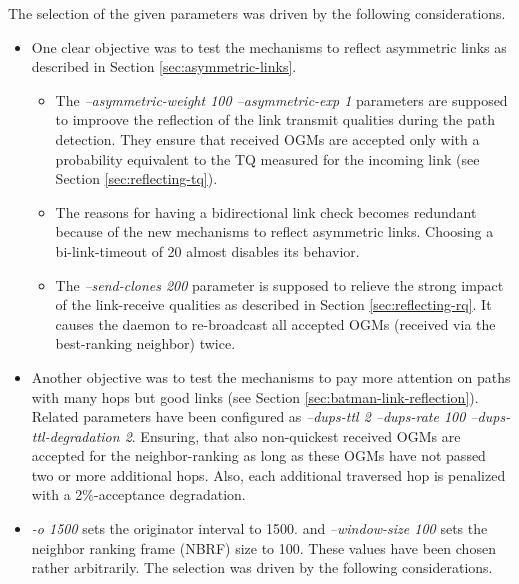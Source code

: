 \documentclass[11pt]{article}
\begin{document}
The selection of the given parameters was driven by the following considerations.
\begin{itemize}


\item One clear objective was to test the mechanisms to reflect asymmetric links as described in Section \ref{sec:asymmetric-links}. 

\begin{itemize}

\item The \emph{--asymmetric-weight 100 --asymmetric-exp 1} parameters are supposed to improove the reflection of the link transmit qualities during the path detection. 
%
They ensure that received OGMs are accepted only with a probability equivalent to the TQ measured for the incoming link (see Section \ref{sec:reflecting-tq}). 

\item The reasons for having a bidirectional link check becomes redundant because of the new mechanisms to reflect asymmetric links. Choosing a bi-link-timeout of 20 almost disables its behavior.

\item The \emph{--send-clones 200} parameter is supposed to relieve the strong impact of the link-receive qualities as described in Section \ref{sec:reflecting-rq}. It causes the daemon to re-broadcast all accepted OGMs (received via the best-ranking neighbor) twice.

\end{itemize}

\item Another objective was to test the mechanisms to pay more attention on paths with many hops but good links (see Section \ref{sec:batman-link-reflection}). 
Related parameters have been configured as \emph{--dups-ttl 2 --dups-rate 100 --dups-ttl-degradation 2}. Ensuring, that also non-quickest received OGMs are accepted for the neighbor-ranking as long as these OGMs have not passed two or more additional hops. Also, each additional traversed hop is penalized with a 2\%-acceptance degradation.


\item \emph{-o 1500} sets the originator interval to 1500. and \emph{--window-size 100} sets the neighbor ranking frame (NBRF) size to 100. These values have been chosen rather arbitrarily. The selection was driven by the following considerations.
\begin{itemize}


\end{itemize}
\end{itemize}
\end{document}
